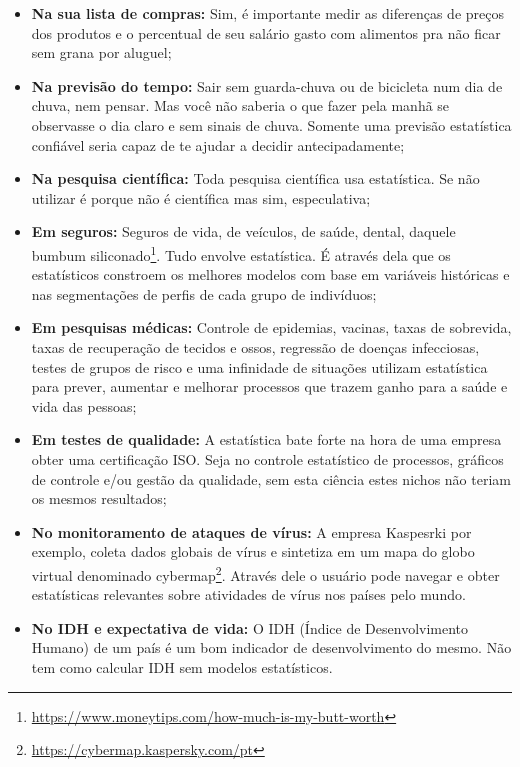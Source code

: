 \documentclass[12pt,]{style/krantz}
\renewcommand{\href}[2]{#2\footnote{\url{#1}}}
\theoremstyle{definition}
\theoremstyle{definition}
\theoremstyle{definition}
\theoremstyle{remark}
\begin{document}
\begin{itemize}
\item
  \textbf{Na sua lista de compras:} Sim, é importante medir as
  diferenças de preços dos produtos e o percentual de seu salário gasto
  com alimentos pra não ficar sem grana por aluguel;
\item
  \textbf{Na previsão do tempo:} Sair sem guarda-chuva ou de bicicleta
  num dia de chuva, nem pensar. Mas você não saberia o que fazer pela
  manhã se observasse o dia claro e sem sinais de chuva. Somente uma
  previsão estatística confiável seria capaz de te ajudar a decidir
  antecipadamente;
\item
  \textbf{Na pesquisa científica:} Toda pesquisa científica usa
  estatística. Se não utilizar é porque não é científica mas sim,
  especulativa;
\item
  \textbf{Em seguros:} Seguros de vida, de veículos, de saúde, dental,
  daquele
  \href{https://www.moneytips.com/how-much-is-my-butt-worth}{bumbum
  siliconado}. Tudo envolve estatística. É através dela que os
  estatísticos constroem os melhores modelos com base em variáveis
  históricas e nas segmentações de perfis de cada grupo de indivíduos;
\item
  \textbf{Em pesquisas médicas:} Controle de epidemias, vacinas, taxas
  de sobrevida, taxas de recuperação de tecidos e ossos, regressão de
  doenças infecciosas, testes de grupos de risco e uma infinidade de
  situações utilizam estatística para prever, aumentar e melhorar
  processos que trazem ganho para a saúde e vida das pessoas;
\item
  \textbf{Em testes de qualidade:} A estatística bate forte na hora de
  uma empresa obter uma certificação ISO. Seja no controle estatístico
  de processos, gráficos de controle e/ou gestão da qualidade, sem esta
  ciência estes nichos não teriam os mesmos resultados;
\item
  \textbf{No monitoramento de ataques de vírus:} A empresa Kaspesrki por
  exemplo, coleta dados globais de vírus e sintetiza em um mapa do globo
  virtual denominado \href{https://cybermap.kaspersky.com/pt}{cybermap}.
  Através dele o usuário pode navegar e obter estatísticas relevantes
  sobre atividades de vírus nos países pelo mundo.
\item
  \textbf{No IDH e expectativa de vida:} O IDH (Índice de
  Desenvolvimento Humano) de um país é um bom indicador de
  desenvolvimento do mesmo. Não tem como calcular IDH sem modelos
  estatísticos.
\end{itemize}
\end{document}
